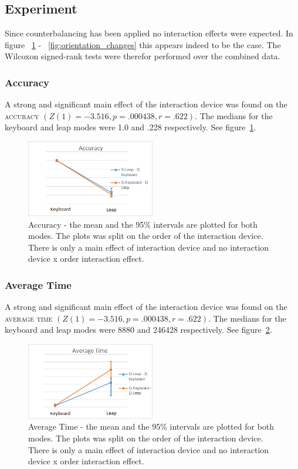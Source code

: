 \subsection{Experiment}
Since counterbalancing has been applied no interaction effects were expected. In figure ~\ref{fig:accuracy} - ~\ref{fig:orientation_changes} this appears indeed to be the case. The Wilcoxon signed-rank tests were therefor performed over the combined data.

\subsubsection{Accuracy}

A strong and significant main effect of the interaction device was found on the \textsc{accuracy} $(Z(1) = -3.516, p = .000438, r = .622)$. The medians for the keyboard and leap modes were 1.0 and .228 respectively. See figure~\ref{fig:accuracy}.

\begin{figure}[H]
\centering
\includegraphics[width=0.5\textwidth]{imgs/results/accuracy}
\caption{Accuracy - the mean and the 95\% intervals are plotted for both modes. The plots was split on the order of the interaction device. There is only a main effect of interaction device and no interaction device x order interaction effect.}
\label{fig:accuracy}
\end{figure}

\subsubsection{Average Time}

A strong and significant main effect of the interaction device was found on the \textsc{average time} $(Z(1) = -3.516, p = .000438, r = .622)$. The medians for the keyboard and leap modes were 8880 and 246428 respectively. See figure~\ref{fig:average_time}.

\begin{figure}[H]
\centering
\includegraphics[width=0.5\textwidth]{imgs/results/average_time}
\caption{Average Time - the mean and the 95\% intervals are plotted for both modes. The plots was split on the order of the interaction device. There is only a main effect of interaction device and no interaction device x order interaction effect.}
\label{fig:average_time}
\end{figure}

